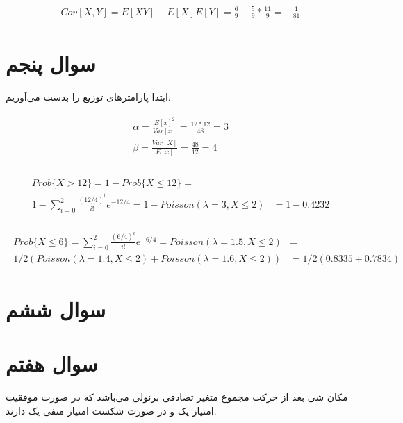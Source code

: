 \documentclass[paper=a4, fontsize=11pt]{article}
\numberwithin{equation}{section} %
\numberwithin{figure}{section} %
\numberwithin{table}{section} %
\begin{document}
\begin{align}
\begin{split}
    Cov[X,Y] = E[XY] - E[X]E[Y] = \frac{6}{9} - \frac{5}{9} * \frac{11}{9} = -\frac{1}{81}
\end{split}
\end{align}

\section{سوال پنجم}
ابتدا پارامتر‌های توزیع را بدست می‌آوریم.

\begin{align}
\begin{split}
    \alpha = \frac{E[x]^2}{Var[x]} = \frac{12 * 12}{48} = 3\\
    \beta = \frac{Var[X]}{E[x]} = \frac{48}{12} = 4\\
\end{split}
\end{align}

\begin{align}
\begin{split}
    Prob\{X > 12\} = 1 - Prob\{X \le 12\} =&\\
    1 - \sum_{i=0}^{2} \frac{(12/4)^i}{i!} e^{-12/4} = 1 - Poisson(\lambda = 3, X \le 2)
    &= 1 - 0.4232
\end{split}
\end{align}

\begin{align}
\begin{split}
    Prob\{X \le 6\} = \sum_{i=0}^{2} \frac{(6/4)^i}{i!} e^{-6/4} = Poisson(\lambda = 1.5, X \le 2) &=\\
    1/2 (Poisson(\lambda = 1.4, X \le 2) + Poisson(\lambda = 1.6, X \le 2)) &= 1/2(0.8335 + 0.7834)
\end{split}
\end{align}

\section{سوال ششم}

\section{سوال هفتم}

مکان شی بعد از 
حرکت مجموع 
متغیر تصادفی برنولی می‌باشد که
در صورت موفقیت امتیاز یک و در صورت شکست امتیاز منفی یک دارند.
\end{document}
